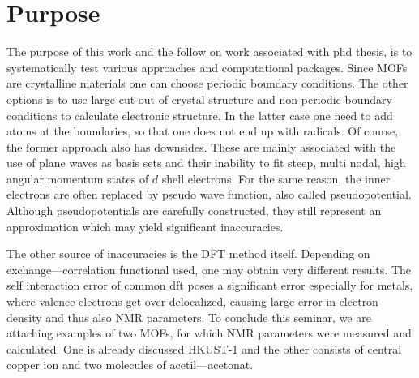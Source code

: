 \documentclass[openany, longbibliography,slovene,a4paper,12pt]{article}
\begin{document}
\section{Purpose}
The purpose of this work and the follow on work associated with phd thesis, is to
systematically test various approaches and computational packages. Since MOFs
are crystalline materials one can choose periodic boundary conditions. The other
options is to use large cut-out of crystal structure and non-periodic boundary conditions to calculate
electronic structure. In the latter case one need to add atoms at the
boundaries, so that one does not end up with radicals. Of course, the former
approach also has downsides. These are mainly associated with the use of plane
waves as basis sets and their inability to fit steep, multi nodal, high angular
momentum states of $d$ shell electrons. For the same reason, the inner electrons
are often replaced by pseudo wave function, also called pseudopotential.
Although pseudopotentials are carefully constructed, they still represent an
approximation which may yield significant inaccuracies.

The other source of inaccuracies is the DFT method itself. Depending on
exchange---correlation functional used, one may obtain very different results.
The self interaction error of common dft poses a significant error especially
for metals, where valence electrons get over delocalized, causing large error in
electron density and thus also NMR parameters. To conclude this seminar, we are
attaching examples of two MOFs, for which NMR parameters were measured and
calculated. One is already discussed HKUST-1 and the other consists of central
copper ion and two molecules of acetil---acetonat.
\\
\end{document}
